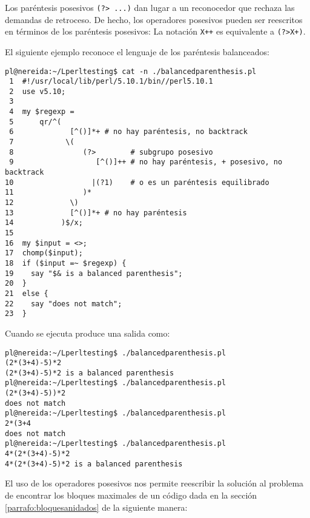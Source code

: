 
Los paréntesis posesivos \verb|(?> ...)| dan lugar a un reconocedor 
que rechaza las demandas de retroceso. 
De hecho, los operadores posesivos pueden ser reescritos 
en términos de los paréntesis posesivos:
La notación \verb|X++| es equivalente a \verb|(?>X+)|.


El siguiente ejemplo reconoce el lenguaje de los paréntesis balanceados:
\begin{verbatim}
pl@nereida:~/Lperltesting$ cat -n ./balancedparenthesis.pl
 1  #!/usr/local/lib/perl/5.10.1/bin//perl5.10.1
 2  use v5.10;
 3
 4  my $regexp =
 5      qr/^(
 6             [^()]*+ # no hay paréntesis, no backtrack
 7            \(
 8                (?>        # subgrupo posesivo
 9                   [^()]++ # no hay paréntesis, + posesivo, no backtrack
10                  |(?1)    # o es un paréntesis equilibrado
11                )*
12             \)
13             [^()]*+ # no hay paréntesis
14           )$/x;
15
16  my $input = <>;
17  chomp($input);
18  if ($input =~ $regexp) {
19    say "$& is a balanced parenthesis";
20  }
21  else {
22    say "does not match";
23  }
\end{verbatim}
Cuando se ejecuta produce una salida como:
\begin{verbatim}
pl@nereida:~/Lperltesting$ ./balancedparenthesis.pl
(2*(3+4)-5)*2
(2*(3+4)-5)*2 is a balanced parenthesis
pl@nereida:~/Lperltesting$ ./balancedparenthesis.pl
(2*(3+4)-5))*2
does not match
pl@nereida:~/Lperltesting$ ./balancedparenthesis.pl
2*(3+4
does not match
pl@nereida:~/Lperltesting$ ./balancedparenthesis.pl
4*(2*(3+4)-5)*2
4*(2*(3+4)-5)*2 is a balanced parenthesis
\end{verbatim}


El uso de los operadores posesivos nos permite reescribir 
la solución al problema de encontrar los bloques maximales
de un código dada en la
sección
\ref{parrafo:bloquesanidados}
de la siguiente manera:

